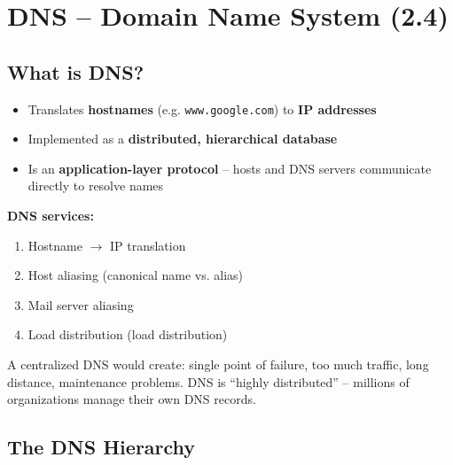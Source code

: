 \newpage
\section{DNS -- Domain Name System (2.4)}

\subsection{What is DNS?}

\begin{keybox}
\begin{itemize}[noitemsep]
    \item Translates \textbf{hostnames} (e.g. \texttt{www.google.com}) to \textbf{IP addresses}
    \item Implemented as a \textbf{distributed, hierarchical database}
    \item Is an \textbf{application-layer protocol} -- hosts and DNS servers communicate directly to resolve names
\end{itemize}
\end{keybox}

\textbf{DNS services:}
\begin{enumerate}[noitemsep]
    \item Hostname $\rightarrow$ IP translation
    \item Host aliasing (canonical name vs. alias)
    \item Mail server aliasing
    \item Load distribution (load distribution)
\end{enumerate}

\begin{warnbox}
A centralized DNS would create: single point of failure, too much traffic, long distance, maintenance problems. DNS is ``highly distributed'' -- millions of organizations manage their own DNS records.
\end{warnbox}

\subsection{The DNS Hierarchy}

